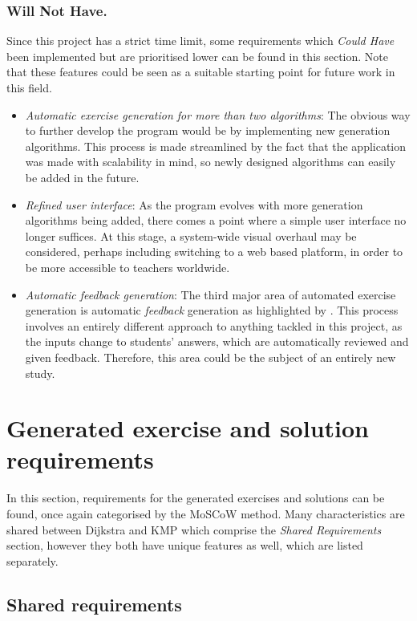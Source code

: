 \documentclass{l4proj}
\begin{document}
\subsubsection{Will Not Have.}
Since this project has a strict time limit, some requirements which \emph{Could Have} been implemented but are prioritised lower can be found in this section. Note that these features could be seen as a suitable starting point for future work in this field.
\begin{itemize}
	\item
	\emph{Automatic exercise generation for more than two algorithms}: The obvious way to further develop the program would be by implementing new generation algorithms. This process is made streamlined by the fact that the application was made with scalability in mind, so newly designed algorithms can easily be added in the future.
	\item
	\emph{Refined user interface}: As the program evolves with more generation algorithms being added, there comes a point where a simple user interface no longer suffices. At this stage, a system-wide visual overhaul may be considered, perhaps including switching to a web based platform, in order to be more accessible to teachers worldwide. 
	\item
	\emph{Automatic feedback generation}: The third major area of automated exercise generation is automatic \emph{feedback} generation as highlighted by \cite{}. This process involves an entirely different approach to anything tackled in this project, as the inputs change to students' answers, which are automatically reviewed and given feedback. Therefore, this area could be the subject of an entirely new study.
\end{itemize}

\section{Generated exercise and solution requirements}

In this section, requirements for the generated exercises and solutions can be found, once again categorised by the MoSCoW method. Many characteristics are shared between Dijkstra and KMP which comprise the \emph{Shared Requirements} section, however they both have unique features as well, which are listed separately.

\subsection{Shared requirements}
\end{document}
